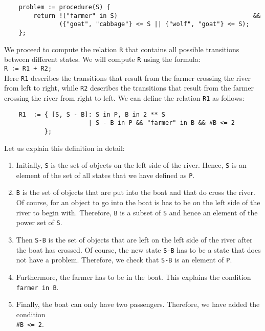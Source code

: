 \begin{verbatim}
    problem := procedure(S) {
        return !("farmer" in S)                                     && 
               ({"goat", "cabbage"} <= S || {"wolf", "goat"} <= S);
    };
\end{verbatim}
We proceed to compute the relation \texttt{R} that contains all possible transitions between
different states.  We will compute \texttt{R} using the formula:
\\[0.2cm]
\hspace*{0.75cm}
\texttt{R := R1 + R2;}
\\[0.2cm]
Here \texttt{R1} describes the transitions that result from the farmer crossing the river from left
to right, while \texttt{R2} describes the transitions that result from the farmer crossing the river
from right to left.  We can define the relation \texttt{R1} as follows:
\begin{verbatim}
    R1  := { [S, S - B]: S in P, B in 2 ** S
                       | S - B in P && "farmer" in B && #B <= 2
           };
\end{verbatim}
Let us explain this definition in detail:
\begin{enumerate}
\item Initially, \texttt{S} is the set of objects on the left side of the river.  Hence, \texttt{S}
      is an element of the set of all states that we have defined as \texttt{P}.
\item \texttt{B} is the set of objects that are put into the boat and that do cross the river.  Of
      course, for an object to go into the boat is has to be on the left side of the river to begin
      with.  Therefore, \texttt{B} is a subset of \texttt{S} and hence an element of the power set
      of \texttt{S}. 
\item Then  \texttt{S-B} is the set of objects that are left on the left side of the river after
      the boat has crossed.  Of course, the new state \texttt{S-B} has to be a state that does not
      have a problem.  Therefore, we check that \texttt{S-B} is an element of \texttt{P}.
\item Furthermore, the farmer has to be in the boat.  This explains the condition 
      \\[0.2cm]
      \hspace*{1.3cm}
      \texttt{farmer in B}.
\item Finally, the boat can only have two passengers.  Therefore, we have added the condition
      \\[0.2cm]
      \hspace*{1.3cm}
      \texttt{\#B <= 2}.
\end{enumerate}
